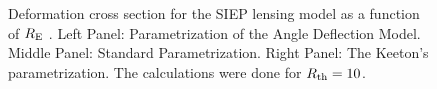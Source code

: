 \begin{figure}[!ht]
{}
\caption{\label{dcs_siep_re} Deformation cross section for the  SIEP lensing model as a function of $R_{\rm E}$ . Left Panel:
Parametrization of the Angle Deflection Model. Middle Panel: Standard
Parametrization. Right Panel: The Keeton's parametrization.  The calculations
were done for $R_{\rm th}=10$.}
\end{figure}

